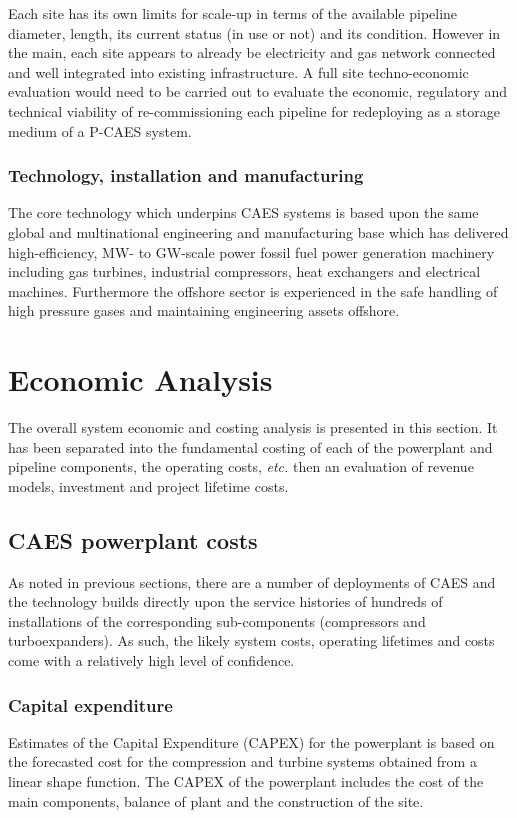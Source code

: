 \documentclass[preprint,12pt]{elsarticle}
\begin{document}
Each site has its own limits for scale-up in terms of the available pipeline diameter, length, its current status (in use or not) and its condition. However in the main, each site appears to already be electricity and gas network connected and well integrated into existing infrastructure. A full site techno-economic evaluation would need to be carried out to evaluate the economic, regulatory and technical viability of re-commissioning each pipeline for redeploying as a storage medium of a P-CAES system.

\subsubsection{Technology, installation and manufacturing}
The core technology which underpins CAES systems is based upon the same global and multinational engineering and manufacturing base which has delivered high-efficiency, MW- to GW-scale power fossil fuel power generation machinery including gas turbines, industrial compressors, heat exchangers and electrical machines. Furthermore the offshore sector is experienced in the safe handling of high pressure gases and maintaining engineering assets offshore. 

\section{Economic Analysis}
\label{Sec:Counterfactual}
The overall system economic and costing analysis is presented in this section. It has been separated into the fundamental costing of each of the powerplant and pipeline components, the operating costs, \textit{etc.} then an evaluation of revenue models, investment and project lifetime costs.

\subsection{CAES powerplant costs}
As noted in previous sections, there are a number of deployments of CAES and the technology builds directly upon the service histories of hundreds of installations of the corresponding sub-components (compressors and turboexpanders). As such, the likely system costs, operating lifetimes and costs come with a relatively high level of confidence.

\subsubsection{Capital expenditure}
Estimates of the Capital Expenditure (CAPEX) for the powerplant is based on the forecasted cost for the compression and turbine systems obtained from a linear shape function. The CAPEX of the powerplant includes the cost of the main components, balance of plant and the construction of the site.
\end{document}
